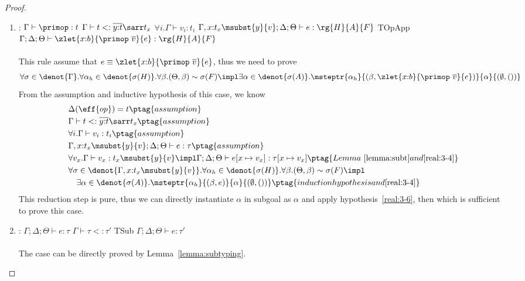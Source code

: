 \begin{proof}
\begin{enumerate}[label=Case]
\item:
{\footnotesize
\mprooftr{58mm}
{
$\Gamma \vdash \primop : t$ \quad $\Gamma \vdash t <: \overline{y{:}t}\sarr t_x$
$\forall i. \Gamma \vdash v_i : t_i$ \quad
$\Gamma, x{:}t_x\msubst{y}{v};\Delta;\Theta \vdash e : \rg{H}{A}{F}$
}
{TOpApp}
{$\Gamma;\Delta;\Theta \vdash \zlet{x{:}b}{\primop\ \overline{v}}{e} : \rg{H}{A}{F}$}
\ \\ \ \\}
This rule assume that $e \equiv \zlet{x{:}b}{\primop\ \overline{v}}{e}$, thus we need to prove
{\footnotesize\begin{align*}
  \forall \sigma \in \denot{\Gamma}.\forall \alpha_h \in \denot{\sigma(H)}. \forall \beta. (\Theta, \beta) \sim \sigma(F) \impl \exists \alpha \in\denot{\sigma(A)}. \msteptr{\alpha_h}{(\beta, \zlet{x{:}b}{\primop\ \overline{v}}{e})}{\alpha}{(\emptyset, ())}
\end{align*}}\noindent
From the assumption and inductive hypothesis of this case, we know
{\footnotesize\begin{alignat}{2}
\setcounter{equation}{0}
&\Delta(\eff{op}) = t \ptag{assumption} \label{real:3-1} \\
&\Gamma \vdash t <: \overline{y{:}t}\sarr t_x \ptag{assumption} \label{real:3-2} \\
&\forall i. \Gamma \vdash v_i : t_i \ptag{assumption} \label{real:3-3} \\
&\Gamma, x{:}t_x\msubst{y}{v};\Delta;\Theta \vdash e : \tau \ptag{assumption} \label{real:3-4} \\
&\forall v_x. \Gamma \vdash v_x : t_x\msubst{y}{v} \impl \Gamma;\Delta;\Theta \vdash e[x\mapsto v_x] : \tau[x\mapsto v_x] \ptag{Lemma~\ref{lemma:subt} and \ref{real:3-4}} \label{real:3-5} \\
& \forall \sigma \in \denot{\Gamma,  x{:}t_x\msubst{y}{v}}.\forall \alpha_h \in \denot{\sigma(H)}. \forall \beta. (\Theta, \beta) \sim \sigma(F) \impl 
\\&\quad \exists \alpha \in\denot{\sigma(A)}. \msteptr{\alpha_h}{(\beta, e)}{\alpha}{(\emptyset, ())}
\ptag{induction hypothesis and \ref{real:3-4}} \label{real:3-6}
\end{alignat}}\noindent
This reduction step is pure, thus we can directly instantiate $\alpha$ in subgoal as $\alpha$ and apply hypothesis~\ref{real:3-6}, then which is sufficient to prove this case.

\item:
{\footnotesize
\mprooftr{38mm}
{$\Gamma;\Delta;\Theta \vdash e : \tau$ \quad
$\Gamma \vdash \tau <: \tau'$}
{TSub}
{$\Gamma;\Delta;\Theta \vdash e : \tau'$}
\ \\ \ \\}
The case can be directly proved by Lemma~\ref{lemma:subtyping}.

\end{enumerate}
\end{proof}

